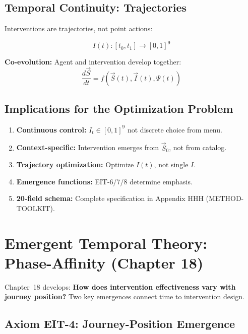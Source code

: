 \subsection{Temporal Continuity: Trajectories}

Interventions are trajectories, not point actions:

\begin{equation}
I(t): [t_0, t_1] \to [0,1]^9
\label{eq:mp-trajectory}
\end{equation}

\textbf{Co-evolution:} Agent and intervention develop together:
\begin{equation}
\frac{d\vec{S}}{dt} = f(\vec{S}(t), \vec{I}(t), \Psi(t))
\label{eq:mp-coevolution}
\end{equation}

\subsection{Implications for the Optimization Problem}

\begin{enumerate}[nosep]
\item \textbf{Continuous control:} $I_t \in [0,1]^9$ not discrete choice from menu.
\item \textbf{Context-specific:} Intervention emerges from $\vec{S}_0$, not from catalog.
\item \textbf{Trajectory optimization:} Optimize $I(t)$, not single $I$.
\item \textbf{Emergence functions:} EIT-6/7/8 determine emphasis.
\item \textbf{20-field schema:} Complete specification in Appendix HHH (METHOD-TOOLKIT).
\end{enumerate}

\section{Emergent Temporal Theory: Phase-Affinity (Chapter 18)}
\label{sec:mp-temporal}

Chapter~18 develops: \textbf{How does intervention effectiveness vary with journey position?} Two key emergences connect time to intervention design.

\subsection{Axiom EIT-4: Journey-Position Emergence}

